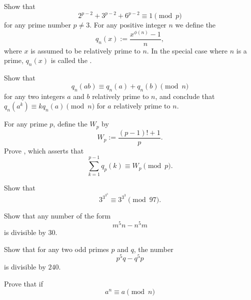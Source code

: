 \begin{routine}
  \exercise Show that
  \begin{equation*}
    2^{p-2}+3^{p-2}+6^{p-2} \equiv 1 \pmod{p}
  \end{equation*}
  for any prime number $p\neq 3$.
  \exercise For any positive integer $n$ we define the 
  \begin{equation*}
    q_n(x):=\frac{x^{\phi(n)}-1}{n},
  \end{equation*}
  where $x$ is assumed to be relatively prime to $n$. In the special case where $n$ is a prime, $q_n(x)$ is called the .
  \begin{subexenum}
  \item Show that
    \begin{equation*}
      q_n(ab)\equiv q_n(a)+q_n(b)\pmod{n}
    \end{equation*}
    for any two integers $a$ and $b$ relatively prime to $n$, and conclude that $q_n(a^k)\equiv k q_n(a)\pmod{n}$ for $a$ relatively prime to $n$.
  \item For any prime $p$, define the  $W_p$ by
    \begin{equation*}
      W_p:=\frac{(p-1)!+1}{p}.
    \end{equation*}
    Prove  \cite{lerch1905}, which asserts that
    \begin{equation*}
      \sum_{k=1}^{p-1}q_p(k)\equiv W_p\pmod{p}.
    \end{equation*}
  \end{subexenum}
  \exercise Show that
  \begin{equation*}
    3^{3^{3^3}}\equiv 3^{3^3}\pmod{97}.
  \end{equation*}
  \exercise
  \begin{subexenum}
  \item Show that any number of the form
    \begin{equation*}
      m^5n-n^5m
    \end{equation*}
    is divisible by $30$.
  \item Show that for any two odd primes $p$ and $q$, the number
    \begin{equation*}
      p^5q-q^5p
    \end{equation*}
    is divisible by $240$.
  \end{subexenum}
  \exercise Prove that if
  \begin{equation*}
    a^n\equiv a \pmod{n}
  \end{equation*}

\end{routine}
